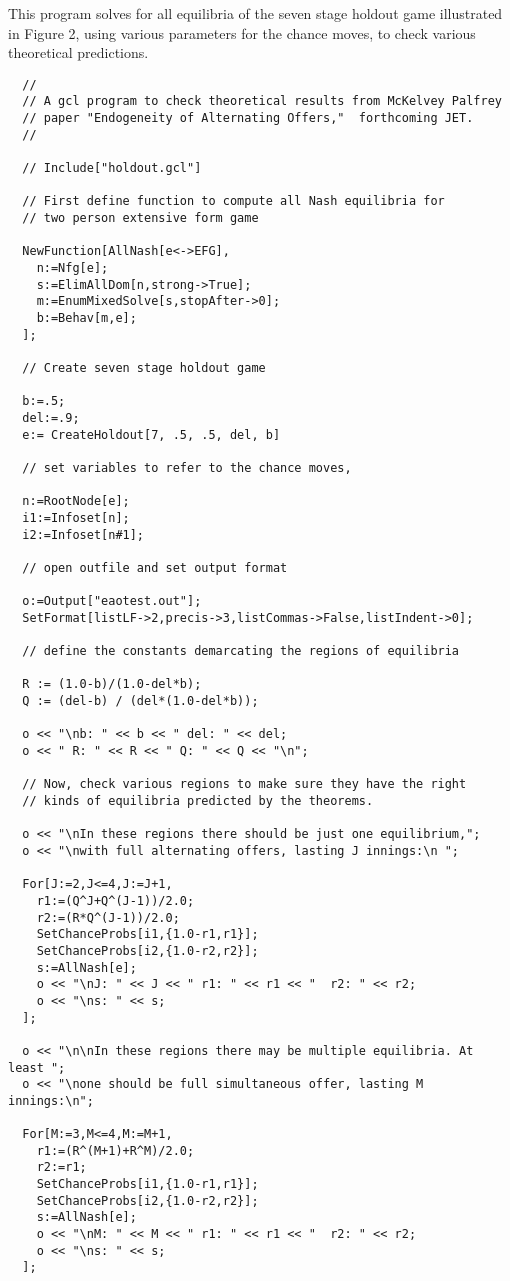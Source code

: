 \noindent
This program solves for all equilibria of the seven stage holdout game
illustrated in Figure 2, using various parameters for the chance
moves, to check various theoretical predictions. 
{\scriptsize
\begin{verbatim}
  //
  // A gcl program to check theoretical results from McKelvey Palfrey 
  // paper "Endogeneity of Alternating Offers,"  forthcoming JET.  
  //

  // Include["holdout.gcl"]

  // First define function to compute all Nash equilibria for 
  // two person extensive form game

  NewFunction[AllNash[e<->EFG],
    n:=Nfg[e];
    s:=ElimAllDom[n,strong->True];
    m:=EnumMixedSolve[s,stopAfter->0];
    b:=Behav[m,e];
  ];

  // Create seven stage holdout game

  b:=.5;
  del:=.9;
  e:= CreateHoldout[7, .5, .5, del, b]

  // set variables to refer to the chance moves, 

  n:=RootNode[e];
  i1:=Infoset[n];
  i2:=Infoset[n#1];

  // open outfile and set output format

  o:=Output["eaotest.out"];
  SetFormat[listLF->2,precis->3,listCommas->False,listIndent->0];

  // define the constants demarcating the regions of equilibria

  R := (1.0-b)/(1.0-del*b);
  Q := (del-b) / (del*(1.0-del*b));

  o << "\nb: " << b << " del: " << del;
  o << " R: " << R << " Q: " << Q << "\n";

  // Now, check various regions to make sure they have the right 
  // kinds of equilibria predicted by the theorems.  

  o << "\nIn these regions there should be just one equilibrium,";
  o << "\nwith full alternating offers, lasting J innings:\n ";

  For[J:=2,J<=4,J:=J+1,
    r1:=(Q^J+Q^(J-1))/2.0;
    r2:=(R*Q^(J-1))/2.0;
    SetChanceProbs[i1,{1.0-r1,r1}];
    SetChanceProbs[i2,{1.0-r2,r2}];
    s:=AllNash[e];
    o << "\nJ: " << J << " r1: " << r1 << "  r2: " << r2;
    o << "\ns: " << s;
  ];

  o << "\n\nIn these regions there may be multiple equilibria. At least ";
  o << "\none should be full simultaneous offer, lasting M innings:\n";

  For[M:=3,M<=4,M:=M+1,
    r1:=(R^(M+1)+R^M)/2.0;
    r2:=r1;
    SetChanceProbs[i1,{1.0-r1,r1}];
    SetChanceProbs[i2,{1.0-r2,r2}];
    s:=AllNash[e];
    o << "\nM: " << M << " r1: " << r1 << "  r2: " << r2;
    o << "\ns: " << s;
  ];
\end{verbatim}
}

